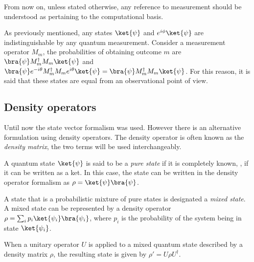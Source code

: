 From now on, unless stated otherwise, any reference to measurement should be understood as pertaining to the computational basis.

As previously mentioned, any states $\ket{\psi}$ and $e^{i\phi}\ket{\psi}$ are indistinguishable by any quantum measurement. Consider a measurement operator $M_m$, the probabilities of obtaining outcome $m$ are $\bra{\psi} M_{m}^{\dagger}M_{m}\ket{\psi}$ and $\bra{\psi} e^{-i \theta} M_{m}^{\dagger}M_{m}e^{i\theta}\ket{\psi}=\bra{\psi} M_{m}^{\dagger}M_{m}\ket{\psi}$. For this reason, it is said that these states are equal from an observational point of view.




\subsection{Density operators}
Until now the state vector formalism was used. However there is an alternative formulation using density operators. The density operator is often known as the \emph{density matrix}, the two terms will be used interchangeably.


\begin{definition}
A quantum state $\ket{\psi}$ is said to be a \emph{pure state} if it is completely known, \ie, if it can be written as a ket. In this case, the state can be written in the density operator formalism as $\rho = \ket{\psi}\bra{\psi}$. 
\end{definition}

\begin{definition}
A state that is a probabilistic mixture of pure states is designated a \emph{mixed state}. A mixed state can be represented by a density operator $\rho= \sum_i p_i\ket{\psi_i}\bra{\psi_i}$, where $p_i$ is the probability of the system being in state $\ket{\psi_i}$.
\end{definition} 

\begin{definition}
  When a unitary operator \( U \) is applied to a mixed quantum state described by a density matrix \( \rho \), the resulting state is given by $ \rho' = U \rho U^\dagger.$
\end{definition}

